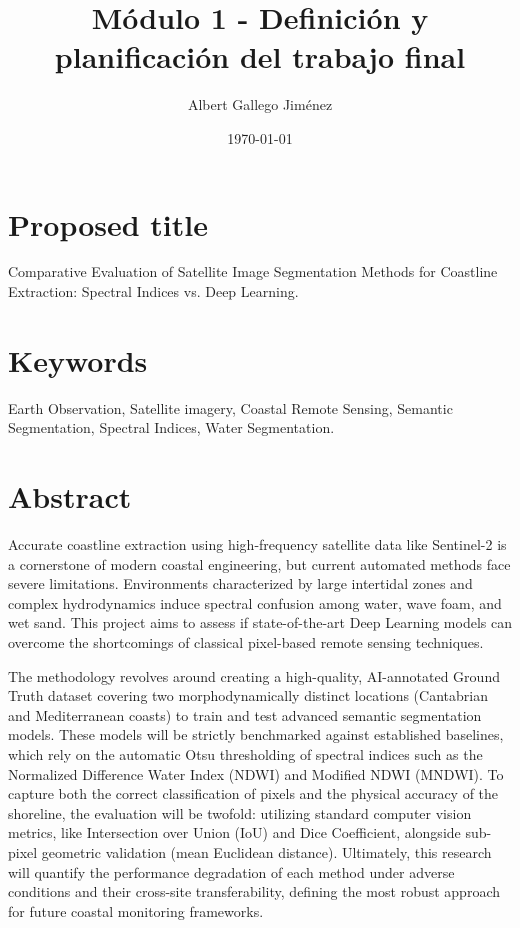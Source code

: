 \documentclass[ENG]{TFUOC}%
\title{Módulo 1 - Definición y planificación del trabajo final}
\author{Albert Gallego Jiménez}
\date{\today}
\begin{document}
\estructura

\tableofcontents

\chapter{Proposed title}
Comparative Evaluation of Satellite Image Segmentation Methods for Coastline Extraction: Spectral Indices vs. Deep Learning.

\chapter{Keywords}
Earth Observation, Satellite imagery, Coastal Remote Sensing, Semantic Segmentation, Spectral Indices, Water Segmentation.

\chapter{Abstract}
Accurate coastline extraction using high-frequency satellite data like Sentinel-2 is a cornerstone of modern coastal engineering, but current automated methods face severe limitations. Environments characterized by large intertidal zones and complex hydrodynamics induce spectral confusion among water, wave foam, and wet sand. This project aims to assess if state-of-the-art Deep Learning models can overcome the shortcomings of classical pixel-based remote sensing techniques.

The methodology revolves around creating a high-quality, AI-annotated Ground Truth dataset covering two morphodynamically distinct locations (Cantabrian and Mediterranean coasts) to train and test advanced semantic segmentation models. These models will be strictly benchmarked against established baselines, which rely on the automatic Otsu thresholding of spectral indices such as the Normalized Difference Water Index (NDWI) and Modified NDWI (MNDWI). To capture both the correct classification of pixels and the physical accuracy of the shoreline, the evaluation will be twofold: utilizing standard computer vision metrics, like Intersection over Union (IoU) and Dice Coefficient, alongside sub-pixel geometric validation (mean Euclidean distance). Ultimately, this research will quantify the performance degradation of each method under adverse conditions and their cross-site transferability, defining the most robust approach for future coastal monitoring frameworks.
\end{document}
